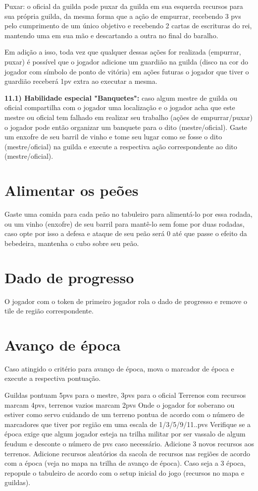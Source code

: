 \documentclass[11pt]{article}
\begin{document}
Puxar: o oficial da guilda pode puxar da guilda em sua esquerda recursos para sua própria guilda, da mesma forma que a ação de empurrar, recebendo 3 pvs pelo cumprimento de um único objetivo
e recebendo 2 cartas de escrituras do rei, mantendo uma em sua mão e descartando a outra no final do baralho.

Em adição a isso, toda vez que qualquer dessas ações for realizada (empurrar, puxar) é possível que o jogador adicione um guardião na guilda (disco na cor do jogador com símbolo de ponto de vitória)
em ações futuras o jogador que tiver o guardião receberá 1pv extra ao executar a mesma.

\textbf{11.1) Habilidade especial "Banquetes":} caso algum mestre de guilda ou oficial compartilha com o jogador uma localização e o jogador acha que este mestre ou oficial tem falhado em realizar
seu trabalho (ações de empurrar/puxar) o jogador pode então organizar um banquete para o dito (mestre/oficial). Gaste um enxofre de seu barril de vinho e tome seu lugar como se fosse o dito
(mestre/oficial) na guilda e execute a respectiva ação correspondente ao dito (mestre/oficial).
\section{Alimentar os peões}
\label{sec:orgheadline8}

Gaste uma comida para cada peão no tabuleiro para alimentá-lo por essa rodada, ou um vinho (enxofre) de seu barril para mantê-lo sem fome por duas rodadas, caso opte por isso a defesa e
ataque de seu peão será 0 até que passe o efeito da bebedeira, mantenha o cubo sobre seu peão.

\section{Dado de progresso}
\label{sec:orgheadline9}

O jogador com o token de primeiro jogador rola o dado de progresso e remove o tile de região correspondente.

\section{Avanço de época}
\label{sec:orgheadline10}

Caso atingido o critério para avanço de época, mova o marcador de época e execute a respectiva pontuação.

Guildas pontuam 5pvs para o mestre, 3pvs para o oficial
Terrenos com recursos marcam 4pvs, terrenos vazios marcam 2pvs
Onde o jogador for soberano ou estiver como servo cuidando de um terreno pontua de acordo com o número de marcadores que tiver por região em uma escala de 1/3/5/9/11..pvs
Verifique se a época exige que algum jogador esteja na trilha militar por ser vassalo de algum feudum e desconte o número de pvs caso necessário.
Adicione 3 novos recursos aos terrenos.
Adicione recursos aleatórios da sacola de recursos nas regiões de acordo com a época (veja no mapa na trilha de avanço de época).
Caso seja a 3 época, repopule o tabuleiro de acordo com o setup inicial do jogo (recursos no mapa e guildas).
\end{document}
